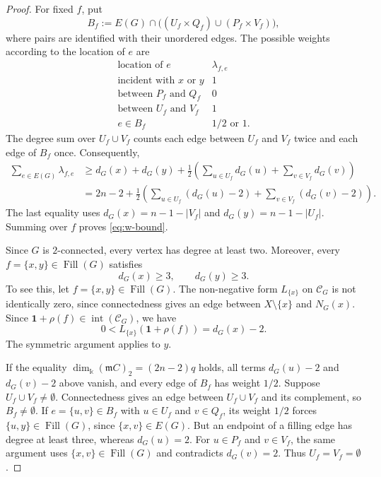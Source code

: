 \documentclass[a4paper,reqno,11pt]{amsart}
\theoremstyle{definition}
\theoremstyle{remark}
\numberwithin{equation}{section}
\newcommand{\kk}{\Bbbk}
\newcommand{\one}{\mathbf 1}
\newcommand{\frakm}{\mathfrak m}
\newcommand{\Fill}{\operatorname{Fill}}
\DeclareMathOperator{\relint}{int}
\begin{document}
\begin{proof}
    For fixed $f$, put
    \[
        B_f:=E(G)\cap\bigl((U_f\times Q_f)\cup(P_f\times V_f)\bigr),
    \]
    where pairs are identified with their unordered edges.
    The possible weights according to the location of $e$ are
    \[
        \begin{array}{c|c}
            \text{location of }e               & \lambda_{f,e}    \\\hline
            \text{incident with }x\text{ or }y & 1                \\
            \text{between }P_f\text{ and }Q_f  & 0                \\
            \text{between }U_f\text{ and }V_f  & 1                \\
            e\in B_f                           & 1/2\text{ or }1.
        \end{array}
    \]
    The degree sum over $U_f\cup V_f$ counts each edge between $U_f$ and $V_f$ twice and each edge of $B_f$ once.
    Consequently,
    \begin{align*}
        \sum_{e\in E(G)}\lambda_{f,e}
         & \ge d_G(x)+d_G(y)+\frac{1}{2}\left(
        \sum_{u\in U_f}d_G(u)+\sum_{v\in V_f}d_G(v)\right) \\
         & =2n-2+\frac{1}{2}\left(
        \sum_{u\in U_f}(d_G(u)-2)+\sum_{v\in V_f}(d_G(v)-2)\right).
    \end{align*}
    The last equality uses $d_G(x)=n-1-|V_f|$ and $d_G(y)=n-1-|U_f|$.
    Summing over $f$ proves \eqref{eq:w-bound}.

    Since $G$ is $2$-connected, every vertex has degree at least two.
    Moreover, every $f=\{x,y\}\in\Fill(G)$ satisfies
    \begin{equation}\label{eq:fill-endpoint-degree}
        d_G(x)\ge3,\qquad d_G(y)\ge3.
    \end{equation}
    To see this, let $f=\{x,y\}\in\Fill(G)$.
    The non-negative form $L_{\{x\}}$ on $\mathcal C_G$ is not identically zero, since connectedness gives an edge between $X\setminus\{x\}$ and $N_G(x)$.
    Since $\one+\rho(f)\in\relint(\mathcal C_G)$, we have
    \[
        0<L_{\{x\}}(\one+\rho(f))=d_G(x)-2.
    \]
    The symmetric argument applies to $y$.

    If the equality $\dim_\kk (\frakm C)_2 =(2n-2)q$ holds, all terms $d_G(u)-2$ and $d_G(v)-2$ above vanish, and every edge of $B_f$ has weight $1/2$.
    Suppose $U_f\cup V_f\ne\emptyset$.
    Connectedness gives an edge between $U_f\cup V_f$ and its complement, so $B_f\ne\emptyset$.
    If $e=\{u,v\}\in B_f$ with $u\in U_f$ and $v\in Q_f$, its weight $1/2$ forces $\{u,y\}\in\Fill(G)$, since $\{x,v\}\in E(G)$.
    But an endpoint of a filling edge has degree at least three, whereas $d_G(u)=2$.
    For $u\in P_f$ and $v\in V_f$, the same argument uses $\{x,v\}\in\Fill(G)$ and contradicts $d_G(v)=2$.
    Thus $U_f=V_f=\emptyset$.
\end{proof}
\end{document}

